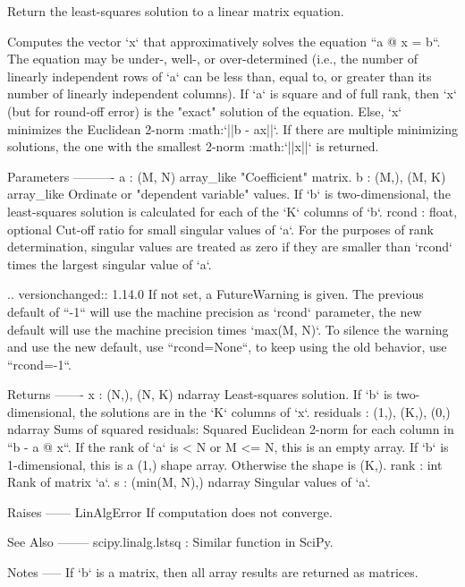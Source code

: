 \begin{DoxyVerb}Return the least-squares solution to a linear matrix equation.

Computes the vector `x` that approximatively solves the equation
``a @ x = b``. The equation may be under-, well-, or over-determined
(i.e., the number of linearly independent rows of `a` can be less than,
equal to, or greater than its number of linearly independent columns).
If `a` is square and of full rank, then `x` (but for round-off error)
is the "exact" solution of the equation. Else, `x` minimizes the
Euclidean 2-norm :math:`||b - ax||`. If there are multiple minimizing 
solutions, the one with the smallest 2-norm :math:`||x||` is returned.

Parameters
----------
a : (M, N) array_like
    "Coefficient" matrix.
b : {(M,), (M, K)} array_like
    Ordinate or "dependent variable" values. If `b` is two-dimensional,
    the least-squares solution is calculated for each of the `K` columns
    of `b`.
rcond : float, optional
    Cut-off ratio for small singular values of `a`.
    For the purposes of rank determination, singular values are treated
    as zero if they are smaller than `rcond` times the largest singular
    value of `a`.

    .. versionchanged:: 1.14.0
       If not set, a FutureWarning is given. The previous default
       of ``-1`` will use the machine precision as `rcond` parameter,
       the new default will use the machine precision times `max(M, N)`.
       To silence the warning and use the new default, use ``rcond=None``,
       to keep using the old behavior, use ``rcond=-1``.

Returns
-------
x : {(N,), (N, K)} ndarray
    Least-squares solution. If `b` is two-dimensional,
    the solutions are in the `K` columns of `x`.
residuals : {(1,), (K,), (0,)} ndarray
    Sums of squared residuals: Squared Euclidean 2-norm for each column in
    ``b - a @ x``.
    If the rank of `a` is < N or M <= N, this is an empty array.
    If `b` is 1-dimensional, this is a (1,) shape array.
    Otherwise the shape is (K,).
rank : int
    Rank of matrix `a`.
s : (min(M, N),) ndarray
    Singular values of `a`.

Raises
------
LinAlgError
    If computation does not converge.

See Also
--------
scipy.linalg.lstsq : Similar function in SciPy.

Notes
-----
If `b` is a matrix, then all array results are returned as matrices.


\end{DoxyVerb}
